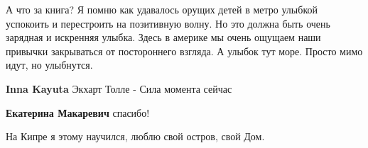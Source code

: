 \begin{itemize}

А что за книга? Я помню как удавалось орущих детей в метро улыбкой успокоить и
перестроить на позитивную волну. Но это должна быть очень зарядная и искренняя
улыбка. Здесь в америке мы очень ощущаем наши привычки закрываться от
постороннего взгляда. А улыбок тут море. Просто мимо идут, но улыбнутся.

\begin{itemize} %
\textbf{Inna Kayuta} Экхарт Толле - Сила момента сейчас

\textbf{Екатерина Макаревич} спасибо!
\end{itemize} %

На Кипре я этому научился, люблю свой остров, свой Дом.

\end{itemize} %
